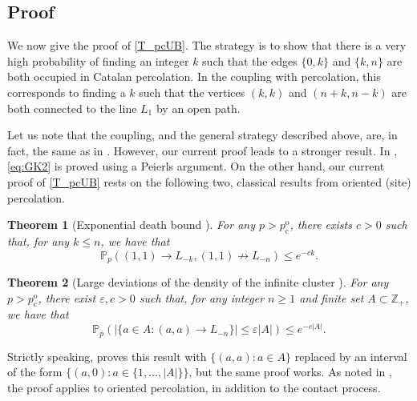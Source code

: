 \documentclass[pdflatex,sn-mathphys-num]{sn-jnl}%
\newcommand{\bbP}{{\ensuremath{\mathbb P}} }
\newcommand{\bbZ}{{\ensuremath{\mathbb Z}} }
\newcommand{\1}{{\ensuremath{\mathbf{1}}} }
\newcommand{\pco}{\ensuremath{p_{\mathrm{c}}^{\mathrm{o}} }}
\theoremstyle{thmstyleone}%
\newtheorem{theorem}{Theorem}%
\theoremstyle{thmstyletwo}%
\theoremstyle{thmstylethree}%
\begin{document}
\subsection{Proof}
We now give the proof of \eqref{T_pcUB}. The strategy is to show that there is a very high probability of finding an integer $k$ such that the edges $\{0,k\}$ and $\{k, n\}$ are both occupied in Catalan percolation. In the coupling with percolation, this corresponds to finding a $k$ such that the vertices $\left( k, k\right)$ and $\left( n+k, n-k\right)$ are both connected to the line $L_1$ by an open path.

Let us note that the coupling, and the
general strategy described above, are, in fact, 
the same as in \cite[Section 3]{Gravner23}. 
However, our current proof 
leads to a stronger result. 
In \cite{Gravner23}, 
\eqref{eq:GK2} is proved using a 
Peierls argument. On the other hand, 
our current proof of
\eqref{T_pcUB}
rests on the following two, classical results from oriented (site) percolation.

\begin{theorem}[Exponential death bound \cite{Durrett83}]
\label{th:death}
For any $p>\pco$, there exists $c>0$ such that,  for any $k\le n$, we have that 
\[\bbP_p\left(\left(1,1\right)\to L_{-k},\left(1,1\right) \not\to L_{-n}\right)\le e^{-ck}.\]
\end{theorem}

\begin{theorem}[Large deviations of the density of the infinite cluster \cite{Durrett88}]
\label{th:LD}
For any $p>\pco$, there exist $\varepsilon,c>0$ such that, for any integer $n \geq 1$ and finite set $A\subset \bbZ_+$, we have that 
\[\bbP_p\left(|\{a\in A:(a,a)\to L_{-n}\}|\le \varepsilon |A|\right)\le e^{-c|A|}.\]
\end{theorem}

Strictly speaking, \cite{Durrett88} proves this result with $\{(a,a):a\in A\}$ replaced by an interval of the form $\{(a,0):a\in\{1,\dots,|A|\}\}$, but the same proof works. As noted in \cite{Durrett88}, the proof applies to oriented percolation, in addition to the contact process.
\end{document}
